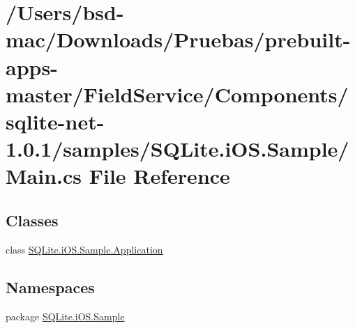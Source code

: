 \hypertarget{_components_2sqlite-net-1_80_81_2samples_2_s_q_lite_8i_o_s_8_sample_2_main_8cs}{\section{/\+Users/bsd-\/mac/\+Downloads/\+Pruebas/prebuilt-\/apps-\/master/\+Field\+Service/\+Components/sqlite-\/net-\/1.0.1/samples/\+S\+Q\+Lite.i\+O\+S.\+Sample/\+Main.cs File Reference}
\label{_components_2sqlite-net-1_80_81_2samples_2_s_q_lite_8i_o_s_8_sample_2_main_8cs}
}
\subsection*{Classes}
\begin{DoxyCompactItemize}
\item 
class \hyperlink{class_s_q_lite_1_1i_o_s_1_1_sample_1_1_application}{S\+Q\+Lite.\+i\+O\+S.\+Sample.\+Application}
\end{DoxyCompactItemize}
\subsection*{Namespaces}
\begin{DoxyCompactItemize}
\item 
package \hyperlink{namespace_s_q_lite_1_1i_o_s_1_1_sample}{S\+Q\+Lite.\+i\+O\+S.\+Sample}
\end{DoxyCompactItemize}
